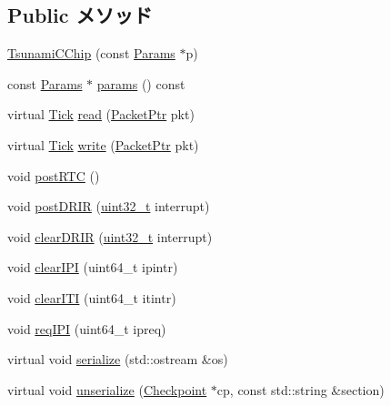 \subsection*{Public メソッド}
\begin{DoxyCompactItemize}
\item 
\hyperlink{classTsunamiCChip_ab55992bfee06f9d23385fad4a1f6f197}{TsunamiCChip} (const \hyperlink{classTsunamiCChip_ae88d115af4688355c68945ae8486b7ec}{Params} $\ast$p)
\item 
const \hyperlink{classTsunamiCChip_ae88d115af4688355c68945ae8486b7ec}{Params} $\ast$ \hyperlink{classTsunamiCChip_acd3c3feb78ae7a8f88fe0f110a718dff}{params} () const 
\item 
virtual \hyperlink{base_2types_8hh_a5c8ed81b7d238c9083e1037ba6d61643}{Tick} \hyperlink{classTsunamiCChip_a613ec7d5e1ec64f8d21fec78ae8e568e}{read} (\hyperlink{classPacket}{PacketPtr} pkt)
\item 
virtual \hyperlink{base_2types_8hh_a5c8ed81b7d238c9083e1037ba6d61643}{Tick} \hyperlink{classTsunamiCChip_a4cefab464e72b5dd42c003a0a4341802}{write} (\hyperlink{classPacket}{PacketPtr} pkt)
\item 
void \hyperlink{classTsunamiCChip_acdd7f639bc4c5a8d164d48a96734d6c1}{postRTC} ()
\item 
void \hyperlink{classTsunamiCChip_a2a04c83ef42523f729c8c5ad75ffa3ea}{postDRIR} (\hyperlink{Type_8hh_a435d1572bf3f880d55459d9805097f62}{uint32\_\-t} interrupt)
\item 
void \hyperlink{classTsunamiCChip_a75bd270f0ce8d71afe064fa3b4128c26}{clearDRIR} (\hyperlink{Type_8hh_a435d1572bf3f880d55459d9805097f62}{uint32\_\-t} interrupt)
\item 
void \hyperlink{classTsunamiCChip_ad463cf06091847c5eef7aba24419eee0}{clearIPI} (uint64\_\-t ipintr)
\item 
void \hyperlink{classTsunamiCChip_a1bc328d0acc40e7f79412b5b3c9b9395}{clearITI} (uint64\_\-t itintr)
\item 
void \hyperlink{classTsunamiCChip_a1f4571959aa97b26452f6accc79abffe}{reqIPI} (uint64\_\-t ipreq)
\item 
virtual void \hyperlink{classTsunamiCChip_a53e036786d17361be4c7320d39c99b84}{serialize} (std::ostream \&os)
\item 
virtual void \hyperlink{classTsunamiCChip_af22e5d6d660b97db37003ac61ac4ee49}{unserialize} (\hyperlink{classCheckpoint}{Checkpoint} $\ast$cp, const std::string \&section)
\end{DoxyCompactItemize}
